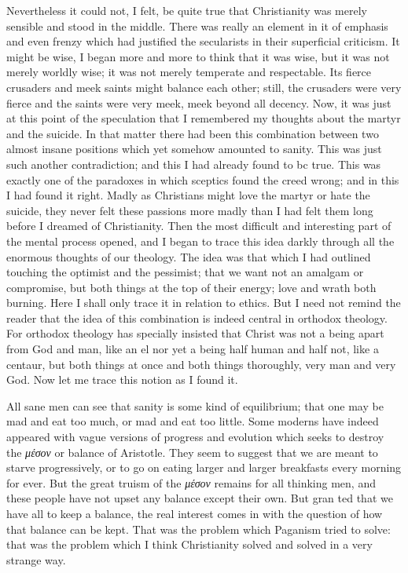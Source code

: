 \documentclass{book}
\begin{document}
Nevertheless it could not, I felt, be quite true that Christianity was merely sensible and stood in the middle. There was really an element in it of emphasis and even frenzy which had justified the secularists in their superficial criticism. It might be wise, I began more and more to think that it was wise, but it was not merely worldly wise; it was not merely temperate and respectable. Its fierce crusaders and meek saints might balance each other; still, the crusaders were very fierce and the saints were very meek, meek beyond all decency. Now, it was just at this point of the speculation that I remembered my thoughts about the martyr and the suicide. In that matter there had been this combination between two almost insane positions which yet somehow amounted to sanity. This was just such another contradiction; and this I had already found to bc true. This was exactly one of the paradoxes in which sceptics found the creed wrong; and in this I had found it right. Madly as Christians might love the martyr or hate the suicide, they never felt these passions more madly than I had felt them long before I dreamed of Christianity. Then the most difficult and interesting part of the mental process opened, and I began to trace this idea darkly through all the enormous thoughts of our theology. The idea was that which I had outlined touching the optimist and the pessimist; that we want not an amalgam or compromise, but both things at the top of their energy; love and wrath both burning. Here I shall only trace it in relation to ethics. But I need not remind the reader that the idea of this combination is indeed central in orthodox theology. For orthodox theology has specially insisted that Christ was not a being apart from God and man, like an el nor yet a being half human and half not, like a centaur, but both things at once and both things thoroughly, very man and very God. Now let me trace this notion as I found it.

All sane men can see that sanity is some kind of equilibrium; that one may be mad and eat too much, or mad and eat too little. Some moderns have indeed appeared with vague versions of progress and evolution which seeks to destroy the \emph{μέσον} or balance of Aristotle. They seem to suggest that we are meant to starve progressively, or to go on eating larger and larger breakfasts every morning for ever. But the great truism of the \emph{μέσον} remains for all thinking men, and these people have not upset any balance except their own. But gran ted that we have all to keep a balance, the real interest comes in with the question of how that balance can be kept. That was the problem which Paganism tried to solve: that was the problem which I think Christianity solved and solved in a very strange way.
\end{document}
